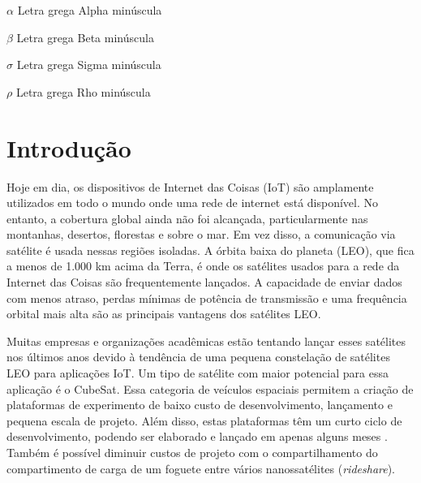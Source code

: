\documentclass[
	12pt,				%
	openright,			%
	twoside,			%
	a4paper,			%
	english,			%
	french,				%
	spanish,			%
	brazil				%
	]{abntex2}
\begin{document}
\begin{simbolos}
  \item[$ \alpha $] Letra grega Alpha minúscula
  \item[$ \beta $] Letra grega Beta minúscula
  \item[$ \sigma $] Letra grega Sigma minúscula
  \item[$ \rho $] Letra grega Rho minúscula
\end{simbolos}

\tableofcontents*
\cleardoublepage



\textual

\chapter{Introdução}

Hoje em dia, os dispositivos de Internet das Coisas (IoT) são amplamente utilizados em todo o mundo onde uma rede de internet está disponível. No entanto, a cobertura global ainda não foi alcançada, particularmente nas montanhas, desertos, florestas e sobre o mar. Em vez disso, a comunicação via satélite é usada nessas regiões isoladas. A órbita baixa do planeta (LEO), que fica a menos de 1.000 km acima da Terra, é onde os satélites usados para a rede da Internet das Coisas são frequentemente lançados. A capacidade de enviar dados com menos atraso, perdas mínimas de potência de transmissão e uma frequência orbital mais alta são as principais vantagens dos satélites LEO. \cite{intro_2021}

Muitas empresas e organizações acadêmicas estão tentando lançar esses satélites nos últimos anos devido à tendência de uma pequena constelação de satélites LEO para aplicações IoT. Um tipo de satélite com maior potencial para essa aplicação é o CubeSat. Essa categoria de veículos espaciais permitem a criação de plataformas de experimento de baixo custo de desenvolvimento, lançamento e pequena escala de projeto. Além disso, estas plataformas têm um curto ciclo de desenvolvimento, podendo ser elaborado e lançado em apenas alguns meses \cite{heidt_2000}. Também é possível diminuir custos de projeto com o compartilhamento do compartimento de carga de um foguete entre vários nanossatélites (\emph{rideshare}).
\end{document}
